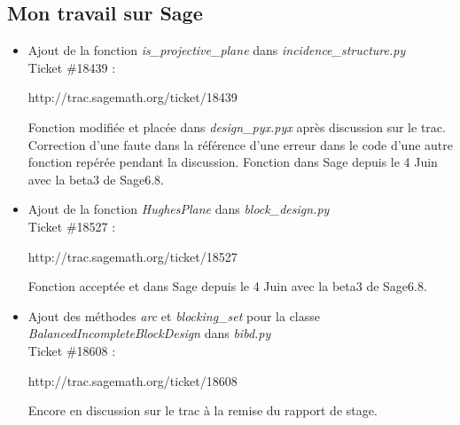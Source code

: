 \documentclass[a4paper]{article}
\begin{document}
\subsection*{Mon travail sur Sage}
\begin{itemize}
\item Ajout de la fonction \textit{is\_projective\_plane} dans \textit{incidence\_structure.py}\\
  Ticket \#18439 :\\
  \begin{sageverbatim}
 http://trac.sagemath.org/ticket/18439
  \end{sageverbatim}
 Fonction modifiée et placée dans \textit{design\_pyx.pyx} après discussion sur le trac. Correction d'une faute dans la référence d'une erreur dans le code d'une autre fonction repérée pendant la discussion. Fonction dans Sage depuis le 4 Juin avec la beta3 de Sage6.8.\vspace{1\baselineskip}\\
\item Ajout de la fonction \textit{HughesPlane} dans \textit{block\_design.py}\\
  Ticket \#18527 :\\
  \begin{sageverbatim}
 http://trac.sagemath.org/ticket/18527
    \end{sageverbatim}
  Fonction acceptée et dans Sage depuis le 4 Juin avec la beta3 de Sage6.8.\vspace{1\baselineskip}\\
\item Ajout des méthodes \textit{arc} et \textit{blocking\_set} pour la classe \textit{BalancedIncompleteBlockDesign} dans \textit{bibd.py}\\
  Ticket \#18608 :\\
\begin{sageverbatim}
 http://trac.sagemath.org/ticket/18608
\end{sageverbatim}
\vspace{1\baselineskip}
  Encore en discussion sur le trac à la remise du rapport de stage.\\
\end{itemize}  
\newpage
\end{document}
